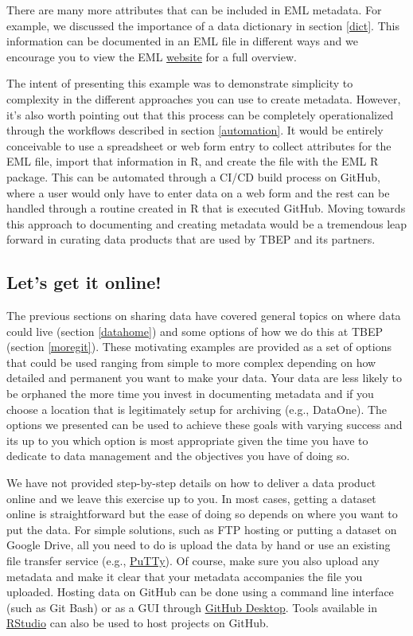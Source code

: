 \documentclass[
]{book}
\begin{document}
There are many more attributes that can be included in EML metadata. For example, we discussed the importance of a data dictionary in section \ref{dict}. This information can be documented in an EML file in different ways and we encourage you to view the EML \href{https://docs.ropensci.org/EML/}{website} for a full overview.

The intent of presenting this example was to demonstrate simplicity to complexity in the different approaches you can use to create metadata. However, it's also worth pointing out that this process can be completely operationalized through the workflows described in section \ref{automation}. It would be entirely conceivable to use a spreadsheet or web form entry to collect attributes for the EML file, import that information in R, and create the file with the EML R package. This can be automated through a CI/CD build process on GitHub, where a user would only have to enter data on a web form and the rest can be handled through a routine created in R that is executed GitHub. Moving towards this approach to documenting and creating metadata would be a tremendous leap forward in curating data products that are used by TBEP and its partners.

\hypertarget{lets-get-it-online}{%
\subsection{Let's get it online!}\label{lets-get-it-online}}

The previous sections on sharing data have covered general topics on where data could live (section \ref{datahome}) and some options of how we do this at TBEP (section \ref{moregit}). These motivating examples are provided as a set of options that could be used ranging from simple to more complex depending on how detailed and permanent you want to make your data. Your data are less likely to be orphaned the more time you invest in documenting metadata and if you choose a location that is legitimately setup for archiving (e.g., DataOne). The options we presented can be used to achieve these goals with varying success and its up to you which option is most appropriate given the time you have to dedicate to data management and the objectives you have of doing so.

We have not provided step-by-step details on how to deliver a data product online and we leave this exercise up to you. In most cases, getting a dataset online is straightforward but the ease of doing so depends on where you want to put the data. For simple solutions, such as FTP hosting or putting a dataset on Google Drive, all you need to do is upload the data by hand or use an existing file transfer service (e.g., \href{https://www.putty.org/}{PuTTy}). Of course, make sure you also upload any metadata and make it clear that your metadata accompanies the file you uploaded. Hosting data on GitHub can be done using a command line interface (such as Git Bash) or as a GUI through \href{https://desktop.github.com/}{GitHub Desktop}. Tools available in \href{https://happygitwithr.com/rstudio-git-github.html}{RStudio} can also be used to host projects on GitHub.
\end{document}
